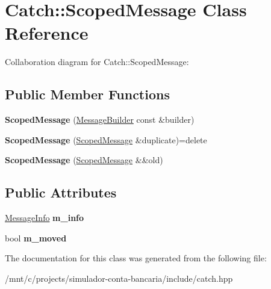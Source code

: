\hypertarget{classCatch_1_1ScopedMessage}{}\section{Catch\+:\+:Scoped\+Message Class Reference}
\label{classCatch_1_1ScopedMessage}


Collaboration diagram for Catch\+:\+:Scoped\+Message\+:
\subsection*{Public Member Functions}
\begin{DoxyCompactItemize}
\item 
\mbox{\label{classCatch_1_1ScopedMessage_a5cc59f0f2ebe840e6607f83004d49a17}} 
{\bfseries Scoped\+Message} (\hyperlink{structCatch_1_1MessageBuilder}{Message\+Builder} const \&builder)
\item 
\mbox{\label{classCatch_1_1ScopedMessage_a5fe2e79afdfd737818c15edfc49f378e}} 
{\bfseries Scoped\+Message} (\hyperlink{classCatch_1_1ScopedMessage}{Scoped\+Message} \&duplicate)=delete
\item 
\mbox{\label{classCatch_1_1ScopedMessage_aac833a6a2245a26e6bd5c9252ca1caa0}} 
{\bfseries Scoped\+Message} (\hyperlink{classCatch_1_1ScopedMessage}{Scoped\+Message} \&\&old)
\end{DoxyCompactItemize}
\subsection*{Public Attributes}
\begin{DoxyCompactItemize}
\item 
\mbox{\label{classCatch_1_1ScopedMessage_ae6e1476f389cc6e1586f033b3747b27b}} 
\hyperlink{structCatch_1_1MessageInfo}{Message\+Info} {\bfseries m\+\_\+info}
\item 
\mbox{\label{classCatch_1_1ScopedMessage_a4fe5607c1f7407240a0da8405b1c12e7}} 
bool {\bfseries m\+\_\+moved}
\end{DoxyCompactItemize}


The documentation for this class was generated from the following file\+:\begin{DoxyCompactItemize}
\item 
/mnt/c/projects/simulador-\/conta-\/bancaria/include/catch.\+hpp\end{DoxyCompactItemize}
